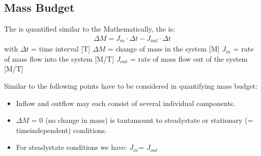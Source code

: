 \documentclass[letterpaper,10pt,english]{sphinxmanual}
\begin{document}
\subsection{Mass Budget}
\label{\detokenize{contents/background/03_basic_hydrogeology:mass-budget}}
The  is quantified similar to the  Mathematically, the  is:
\begin{equation*}
\begin{split}\Delta M = J_{in}\cdot \Delta t - J_{out} \cdot \Delta t\end{split}
\end{equation*}
with 
\(\Delta t\) = time interval {[}T{]}
\(\Delta M\) = change of mass in the system {[}M{]}
\(J_{in}\) = rate of mass flow into the system {[}M/T{]}
\(J_{out}\) = rate of mass flow out of the system {[}M/T{]}

Similar to  the following points have to be considered in quantifying mass budget:
\begin{itemize}
\item {} 
Inflow and outflow may each consist of several individual components.

\item {} 
\(\Delta M\) = 0 (no change in mass) is tantamount to steady\sphinxhyphen{}state or stationary (= time\sphinxhyphen{}independent) conditions.

\item {} 
For steady\sphinxhyphen{}state conditions we have: \(J_{in}\)= \(J_{out}\)

\end{itemize}
\end{document}
